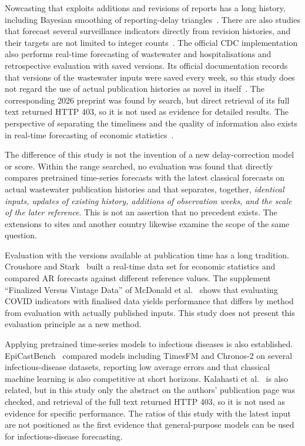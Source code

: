 \documentclass[11pt]{article}
\begin{document}
Nowcasting that exploits additions and revisions of reports has a long history, including Bayesian smoothing of reporting-delay triangles~\cite{mcgough2020}. There are also studies that forecast several surveillance indicators directly from revision histories, and their targets are not limited to integer counts~\cite{tang2025}. The official CDC implementation also performs real-time forecasting of wastewater and hospitalisations and retrospective evaluation with saved versions. Its official documentation records that versions of the wastewater inputs were saved every week, so this study does not regard the use of actual publication histories as novel in itself~\cite{cdcpipeline}. The corresponding 2026 preprint was found by search, but direct retrieval of its full text returned HTTP 403, so it is not used as evidence for detailed results. The perspective of separating the timeliness and the quality of information also exists in real-time forecasting of economic statistics~\cite{giannone2005}.

The difference of this study is not the invention of a new delay-correction model or score. Within the range searched, no evaluation was found that directly compares pretrained time-series forecasts with the latest classical forecasts on actual wastewater publication histories and that separates, together, \emph{identical inputs, updates of existing history, additions of observation weeks, and the scale of the later reference}. This is not an assertion that no precedent exists. The extensions to sites and another country likewise examine the scope of the same question.

Evaluation with the versions available at publication time has a long tradition. Croushore and Stark~\cite{croushore2001} built a real-time data set for economic statistics and compared AR forecasts against different reference values. The supplement ``Finalized Versus Vintage Data'' of McDonald et al.~\cite{mcdonald2021} shows that evaluating COVID indicators with finalised data yields performance that differs by method from evaluation with actually published inputs. This study does not present this evaluation principle as a new method.

Applying pretrained time-series models to infectious diseases is also established. EpiCastBench~\cite{panja2026} compared models including TimesFM and Chronos-2 on several infectious-disease datasets, reporting low average errors and that classical machine learning is also competitive at short horizons. Kalahasti et al.~\cite{kalahasti2025} is also related, but in this study only the abstract on the authors' publication page was checked, and retrieval of the full text returned HTTP 403, so it is not used as evidence for specific performance. The ratios of this study with the latest input are not positioned as the first evidence that general-purpose models can be used for infectious-disease forecasting.
\end{document}
